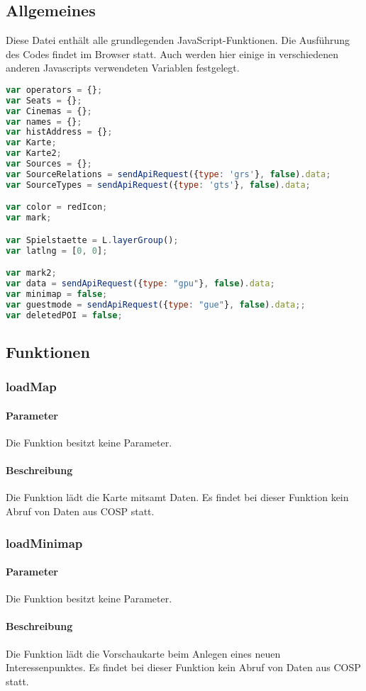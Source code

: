 \subsection{Allgemeines} Diese Datei enthält alle grundlegenden JavaScript-Funktionen.
Die Ausführung des Codes findet im Browser statt. Auch werden hier einige in verschiedenen anderen Javascripts verwendeten Variablen festgelegt.
\begin{lstlisting}[language=JavaScript]
var operators = {};
var Seats = {};
var Cinemas = {};
var names = {};
var histAddress = {};
var Karte;
var Karte2;
var Sources = {};
var SourceRelations = sendApiRequest({type: 'grs'}, false).data;
var SourceTypes = sendApiRequest({type: 'gts'}, false).data;

var color = redIcon;
var mark;

var Spielstaette = L.layerGroup();
var latlng = [0, 0];

var mark2;
var data = sendApiRequest({type: "gpu"}, false).data;
var minimap = false;
var guestmode = sendApiRequest({type: "gue"}, false).data;;
var deletedPOI = false;
\end{lstlisting}
\newpage
\subsection{Funktionen}
\subsubsection{loadMap}
\paragraph{Parameter} Die Funktion besitzt keine Parameter.
\paragraph{Beschreibung} Die Funktion lädt die Karte mitsamt Daten. Es findet bei dieser Funktion kein Abruf von Daten aus {\glqq COSP\grqq} statt.
\subsubsection{loadMinimap}
\paragraph{Parameter} Die Funktion besitzt keine Parameter.
\paragraph{Beschreibung} Die Funktion lädt die Vorschaukarte beim Anlegen eines neuen Interessenpunktes. Es findet bei dieser Funktion kein Abruf von Daten aus {\glqq COSP\grqq} statt.
